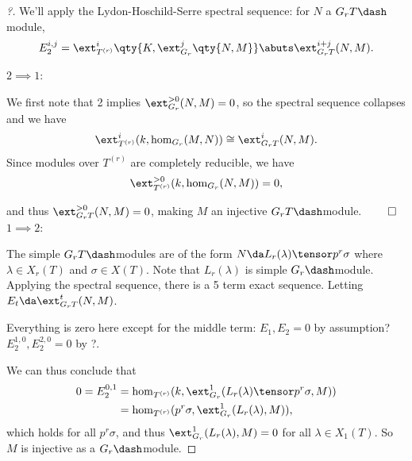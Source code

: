 \begin{proof}[?]

We'll apply the Lydon-Hoschild-Serre spectral sequence: for \(N\) a
\(G_r T\dash\)module,
\begin{align*}  
E_2^{i, j} = \ext_{T^{(r)}}^{i}\qty{K, \ext_{G_r}^j\qty{N, M} } \abuts \ext_{G_r T}^{i+j}(N, M)
.\end{align*}

\(2\implies 1\):

We first note that 2 implies \(\ext_{G_r}^{>0}(N, M) = 0\), so the
spectral sequence collapses and we have
\begin{align*}  
\ext_{T^{(r)}}^i (k, \hom_{G_r}(M, N) ) \cong \ext_{G_r T}^i(N, M)
.\end{align*} Since modules over \(T^{(r)}\) are completely reducible,
we have
\begin{align*}  
\ext_{T^{(r)}}^{>0} ( k, \hom_{G_r}(N, M) ) = 0
,\end{align*}

and thus \(\ext_{G_r T}^{>0}(N, M) = 0\), making \(M\) an injective
\(G_r T\dash\)module. \(\qed\)\\

\(1\implies 2\):

The simple \(G_r T\dash\)modules are of the form
\(N\da L_r(\lambda) \tensor p^r\sigma\) where \(\lambda\in X_r(T)\) and
\(\sigma\in X(T)\). Note that \(L_r(\lambda)\) is simple
\(G_r\dash\)module. Applying the spectral sequence, there is a 5 term
exact sequence. Letting \(E_t \da \ext_{G_rT}^t (N, M)\).

\begin{center}\end{center}

Everything is zero here except for the middle term: \(E_1, E_2 = 0\) by
assumption? \(E_2^{1, 0}, E_2^{2, 0} = 0\) by ?.

We can thus conclude that
\begin{align*}  
0 = E_2^{0, 1}
&= \hom_{T^{(r)}}(k, \ext_{G_r}^1 (L_r(\lambda) \tensor p^r\sigma, M)  ) \\ 
&= \hom_{T^{(r)}}(p^r\sigma, \ext_{G_r}^1 (L_r(\lambda), M)  ) 
,\end{align*} which holds for all \(p^r \sigma\), and thus
\(\ext_{G_r}^1 (L_r(\lambda), M) = 0\) for all \(\lambda\in X_1(T)\). So
\(M\) is injective as a \(G_r\dash\)module.

\end{proof}

